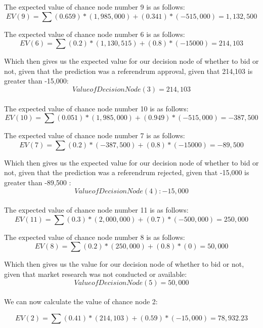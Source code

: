 \documentclass{article}
\begin{document}
 The expected value of chance node number 9 is as follows: 
\[
EV(9) = \sum (0.659) * (1,985,000) + (0.341) * (-515,000) = 1,132,500
\]

 The expected value of chance node number 6 is as follows: 
\[
EV(6) = \sum (0.2) * (1,130,515) + (0.8) * (-15000) = 214,103
\]

 Which then gives us the expected value for our decision node of whether to bid or not, given that the prediction was a referendrum approval, given that 214,103 is greater than -15,000: 
\[
Value of Decision Node (3) = 214,103
\] \\


 The expected value of chance node number 10 is as follows: 
\[
EV(10) = \sum (0.051) * (1,985,000) + (0.949) * (-515,000) = -387,500
\]

 The expected value of chance node number 7 is as follows: 
\[
EV(7) = \sum (0.2) * (-387,500) + (0.8) * (-15000) = -89,500
\]

 Which then gives us the expected value for our decision node of whether to bid or not, given that the prediction was a referendrum rejected, given that -15,000 is greater than -89,500 : 
\[
Value of Decision Node (4): -15,000
\] \\


 The expected value of chance node number 11 is as follows: 
\[
EV(11) = \sum (0.3) * (2,000,000) + (0.7) * (-500,000) = 250,000
\]

 The expected value of chance node number 8 is as follows: 
\[
EV(8) = \sum (0.2) * (250,000) + (0.8) * (0) = 50,000
\]

 Which then gives us the  value for our decision node of whether to bid or not, given that market research was not conducted or available: 
\[
Value of Decision Node (5) = 50,000
\] \\
We can now calculate the value of chance node 2:

\[
EV(2) = \sum (0.41)  * (214,103)  + (0.59) * (-15,000)  = 78,932.23 
\]
\end{document}
